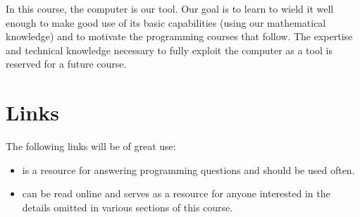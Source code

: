 \documentclass{ximera}
\begin{document}
In this course, the computer is our tool. Our goal is to learn to wield it well enough to make good use of its basic capabilities (using our mathematical knowledge) and to motivate the programming courses that follow. The expertise and technical knowledge necessary to fully exploit the computer as a tool is reserved for a future course. 

\section{Links}

The following links will be of great use:

\begin{itemize}
	\item {} is a resource for answering programming questions and should be used often.
	\item {} can be read online and serves as a resource for anyone interested in the details omitted in various sections of this course.
\end{itemize}
\end{document}
